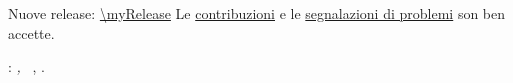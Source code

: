 \clearpage
{}
\thispagestyle{empty}

\hfill

\vfill

\noindent Nuove release: \url{\myRelease}
Le \href{\myPullRequest}{contribuzioni} e le \href{\myIssue}{segnalazioni
di problemi} son ben accette.

\vspace{5px}

\noindent\myName: \textit{\myTitle,}
\textcopyright\ \myCopyright, \the\year.
